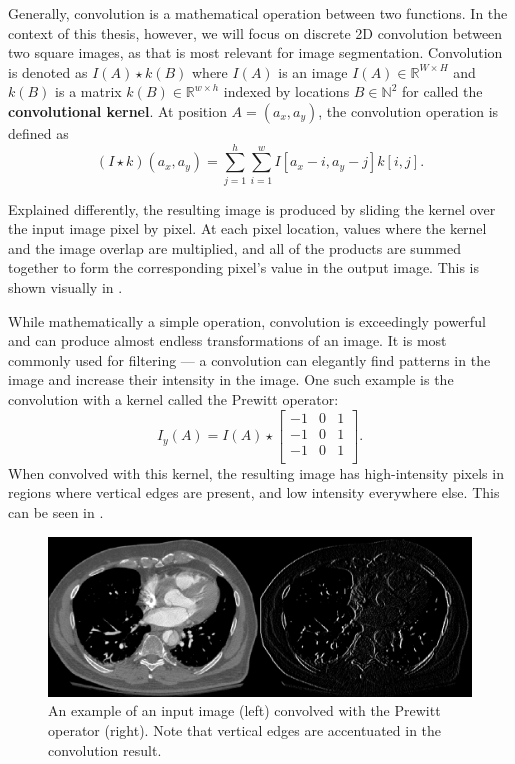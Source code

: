 Generally, convolution is a mathematical operation between two functions. In the context of this thesis, however, we will focus on discrete 2D convolution between two square images, as that is most relevant for image segmentation. Convolution is denoted as $I(A) \star k(B)$ where $I(A)$ is an image $I(A) \in \mathbb{R}^{W \times H}$ and $k(B)$ is a matrix $k(B) \in \mathbb{R}^{w \times h}$ indexed by locations $B \in \mathbb{N}^2$ for called the \textbf{convolutional kernel}. At position $A = (a_x, a_y)$, the convolution operation is defined as
\begin{equation}
(I \star k)(a_x, a_y) = \sum_{j=1}^{h} \sum_{i=1}^{w} I[a_x - i, a_y - j] k[i, j].
\end{equation}

Explained differently, the resulting image is produced by sliding the kernel over the input image pixel by pixel. At each pixel location, values where the kernel and the image overlap are multiplied, and all of the products are summed together to form the corresponding pixel's value in the output image. This is shown visually in .

While mathematically a simple operation, convolution is exceedingly powerful and can produce almost endless transformations of an image. It is most commonly used for filtering --- a convolution can elegantly find patterns in the image and increase their intensity in the image. One such example is the convolution with a kernel called the Prewitt operator:
\begin{equation}
I_y(A) = I(A) \star \begin{bmatrix}
-1 & 0 & 1\\
-1 & 0 & 1\\
-1 & 0 & 1\\
\end{bmatrix}.
\end{equation}
When convolved with this kernel, the resulting image has high-intensity pixels in regions where vertical edges are present, and low intensity everywhere else. This can be seen in .

\begin{figure}[b!]
 \centering
 \includegraphics[width=\linewidth]{images/prewitt-example.png}
 \caption{An example of an input image (left) convolved with the Prewitt operator (right). Note that vertical edges are accentuated in the convolution result.}
 \label{fig:prewitt-example}
 \end{figure}


